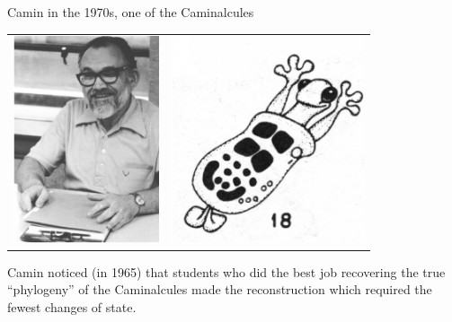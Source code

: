 \documentclass[bluish,slideColor,colorBG,pdf]{prosper}
\begin{document}
\begin{slide}[Replace]{Camin in the 1970s, one of the Caminalcules}

\begin{center}
\begin{tabular}{c c}
\includegraphics[height=2.4in]{camin3.ps} &
\includegraphics[height=2.4in]{caminalcule.ps}
\end{tabular}
\end{center}

Camin noticed (in 1965) that students who did the best job recovering the true
``phylogeny'' of the Caminalcules made the reconstruction which required the
fewest changes of state.

\end{slide}
\end{document}
